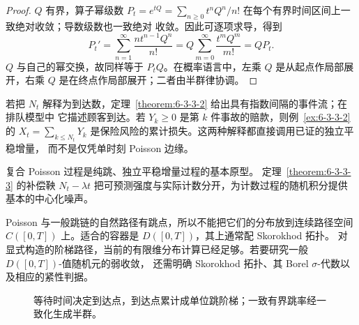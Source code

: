 \begin{proof}
$Q$ 有界，算子幂级数
$P_t=e^{tQ}=\sum_{n\geq0}t^nQ^n/n!$ 在每个有界时间区间上一致绝对收敛；导数级数也一致绝对
收敛。因此可逐项求导，得到
\[
 P_t'=\sum_{n=1}^\infty\frac{nt^{n-1}Q^n}{n!}
 =Q\sum_{m=0}^\infty\frac{t^mQ^m}{m!}=QP_t.
\]
$Q$ 与自己的幂交换，故同样等于 $P_tQ$。在概率语言中，左乘 $Q$ 是从起点作局部展开，右乘
$Q$ 是在终点作局部展开；二者由半群律协调。
\end{proof}

\begin{remark}
若把 $N_t$ 解释为到达数，定理~\ref{theorem:6-3-3-2} 给出具有指数间隔的事件流；在排队模型中
它描述顾客到达。若 $Y_k\ge0$ 是第 $k$ 件事故的赔款，则例~\ref{ex:6-3-3-2} 的
$X_t=\sum_{k\le N_t}Y_k$ 是保险风险的累计损失。这两种解释都直接调用已证的独立平稳增量，
而不是仅凭单时刻 Poisson 边缘。

复合 Poisson 过程是纯跳、独立平稳增量过程的基本原型。
定理~\ref{theorem:6-3-3-3} 的补偿鞅 $N_t-\lambda t$ 把可预测强度与实际计数分开，为计数过程的随机积分提供基本的中心化噪声。
\end{remark}

\begin{remark}
Poisson 与一般跳链的自然路径有跳点，所以不能把它们的分布放到连续路径空间
$C([0,T])$ 上。适合的容器是 \cadlagPathSpace{} $D([0,T])$，其上通常配 Skorokhod 拓扑。
对显式构造的阶梯路径，当前的有限维分布计算已经足够。若要研究一般 $D([0,T])$-值随机元的弱收敛，
还需明确 Skorokhod 拓扑、其 Borel $\sigma$-代数以及相应的紧性判据。
\end{remark}

\begin{figure}[htbp]
\centering
{}
\caption{等待时间决定到达点，到达点累计成单位跳阶梯；一致有界跳率经一致化生成半群。}
\label{fig:6-3-3-arrivals-and-generator}
\end{figure}

